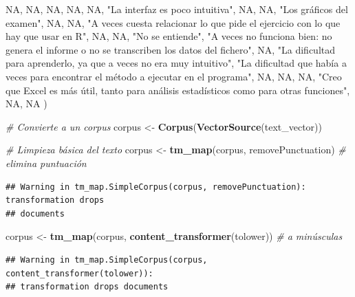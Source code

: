 \documentclass[
]{article}
\newenvironment{Shaded}{\begin{snugshade}}{\end{snugshade}}
\newcommand{\CommentTok}[1]{\textcolor[rgb]{0.56,0.35,0.01}{\textit{#1}}}
\newcommand{\ConstantTok}[1]{\textcolor[rgb]{0.56,0.35,0.01}{#1}}
\newcommand{\FunctionTok}[1]{\textcolor[rgb]{0.13,0.29,0.53}{\textbf{#1}}}
\newcommand{\NormalTok}[1]{#1}
\newcommand{\OtherTok}[1]{\textcolor[rgb]{0.56,0.35,0.01}{#1}}
\newcommand{\StringTok}[1]{\textcolor[rgb]{0.31,0.60,0.02}{#1}}
\begin{document}
\begin{Shaded}
\begin{Highlighting}[]
  \ConstantTok{NA}\NormalTok{,}
  \ConstantTok{NA}\NormalTok{,}
  \ConstantTok{NA}\NormalTok{,}
  \ConstantTok{NA}\NormalTok{,}
  \ConstantTok{NA}\NormalTok{,}
  \StringTok{"La interfaz es poco intuitiva"}\NormalTok{,}
  \ConstantTok{NA}\NormalTok{,}
  \ConstantTok{NA}\NormalTok{,}
  \StringTok{"Los gráficos del examen"}\NormalTok{,}
  \ConstantTok{NA}\NormalTok{,}
  \ConstantTok{NA}\NormalTok{,}
  \StringTok{"A veces cuesta relacionar lo que pide el ejercicio con lo que hay que usar en R"}\NormalTok{,}
  \ConstantTok{NA}\NormalTok{,}
  \ConstantTok{NA}\NormalTok{,}
  \StringTok{"No se entiende"}\NormalTok{,}
  \StringTok{"A veces no funciona bien: no genera el informe o no se transcriben los datos del fichero"}\NormalTok{,}
  \ConstantTok{NA}\NormalTok{,}
  \StringTok{"La dificultad para aprenderlo, ya que a veces no era muy intuitivo"}\NormalTok{,}
  \StringTok{"La dificultad que había a veces para encontrar el método a ejecutar en el programa"}\NormalTok{,}
  \ConstantTok{NA}\NormalTok{,}
  \ConstantTok{NA}\NormalTok{,}
  \ConstantTok{NA}\NormalTok{,}
  \StringTok{"Creo que Excel es más útil, tanto para análisis estadísticos como para otras funciones"}\NormalTok{,}
  \ConstantTok{NA}\NormalTok{,}
  \ConstantTok{NA}
\NormalTok{)}

\CommentTok{\# Convierte a un corpus}
\NormalTok{corpus }\OtherTok{\textless{}{-}} \FunctionTok{Corpus}\NormalTok{(}\FunctionTok{VectorSource}\NormalTok{(text\_vector))}

\CommentTok{\# Limpieza básica del texto}
\NormalTok{corpus }\OtherTok{\textless{}{-}} \FunctionTok{tm\_map}\NormalTok{(corpus, removePunctuation)                    }\CommentTok{\# elimina puntuación}
\end{Highlighting}
\end{Shaded}

\begin{verbatim}
## Warning in tm_map.SimpleCorpus(corpus, removePunctuation): transformation drops
## documents
\end{verbatim}

\begin{Shaded}
\begin{Highlighting}[]
\NormalTok{corpus }\OtherTok{\textless{}{-}} \FunctionTok{tm\_map}\NormalTok{(corpus, }\FunctionTok{content\_transformer}\NormalTok{(tolower))         }\CommentTok{\# a minúsculas}
\end{Highlighting}
\end{Shaded}

\begin{verbatim}
## Warning in tm_map.SimpleCorpus(corpus, content_transformer(tolower)):
## transformation drops documents
\end{verbatim}
\end{document}
